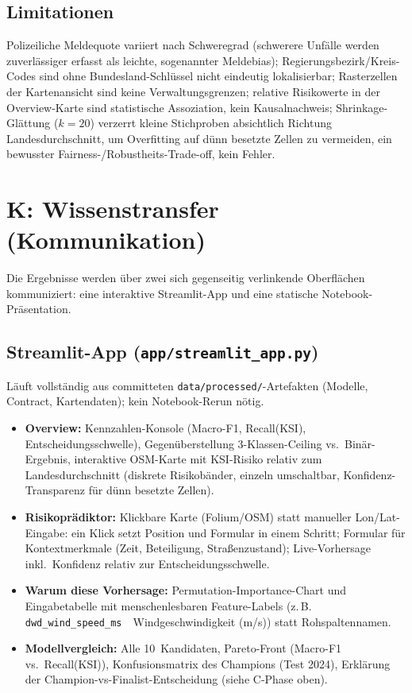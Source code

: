 \documentclass[11pt,a4paper]{article}
\newcommand{\code}[1]{\texttt{\small #1}}
\begin{document}
\subsection*{Limitationen}
Polizeiliche Meldequote variiert nach Schweregrad (schwerere Unfälle
werden zuverlässiger erfasst als leichte, sogenannter Meldebias);
Regierungsbezirk/Kreis-Codes sind ohne Bundesland-Schlüssel nicht
eindeutig lokalisierbar; Rasterzellen der Kartenansicht sind keine
Verwaltungsgrenzen; relative Risikowerte in der Overview-Karte sind
statistische Assoziation, kein Kausalnachweis; Shrinkage-Glättung
($k=20$) verzerrt kleine Stichproben absichtlich Richtung
Landesdurchschnitt, um Overfitting auf dünn besetzte Zellen zu
vermeiden, ein bewusster Fairness-/Robustheits-Trade-off, kein Fehler.


\section{K: Wissenstransfer (Kommunikation)}
Die Ergebnisse werden über zwei sich gegenseitig verlinkende
Oberflächen kommuniziert: eine interaktive Streamlit-App und eine
statische Notebook-Präsentation.

\subsection*{Streamlit-App (\code{app/streamlit\_app.py})}
Läuft vollständig aus committeten \code{data/processed/}-Artefakten
(Modelle, Contract, Kartendaten); kein Notebook-Rerun nötig.

\begin{itemize}
\item \textbf{Overview:} Kennzahlen-Konsole (Macro-F1, Recall(KSI),
  Entscheidungsschwelle), Gegenüberstellung 3-Klassen-Ceiling vs.\
  Binär-Ergebnis, interaktive OSM-Karte mit KSI-Risiko relativ zum
  Landesdurchschnitt (diskrete Risikobänder, einzeln umschaltbar,
  Konfidenz-Transparenz für dünn besetzte Zellen).
\item \textbf{Risikoprädiktor:} Klickbare Karte (Folium/OSM) statt
  manueller Lon/Lat-Eingabe: ein Klick setzt Position und Formular
  in einem Schritt; Formular für Kontextmerkmale (Zeit, Beteiligung,
  Straßenzustand); Live-Vorhersage inkl.\ Konfidenz relativ zur
  Entscheidungsschwelle.
\item \textbf{Warum diese Vorhersage:} Permutation-Importance-Chart
  und Eingabetabelle mit menschenlesbaren Feature-Labels (z.\,B.
  \code{dwd\_wind\_speed\_ms}~\textrightarrow{}~\glqq{}Windgeschwindigkeit
  (m/s)\grqq{}) statt Rohspaltennamen.
\item \textbf{Modellvergleich:} Alle 10~Kandidaten, Pareto-Front
  (Macro-F1 vs.\ Recall(KSI)), Konfusionsmatrix des Champions
  (Test 2024), Erklärung der Champion-vs-Finalist-Entscheidung
  (siehe C-Phase oben).
\end{itemize}
\end{document}

